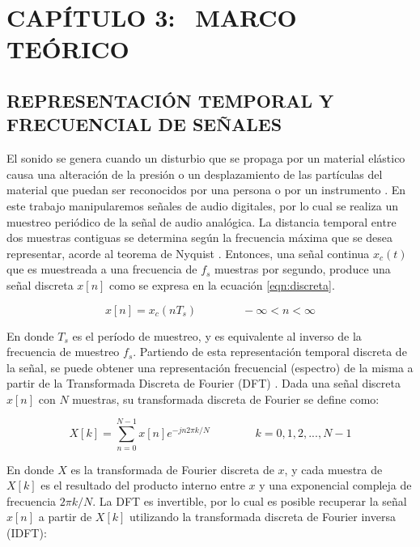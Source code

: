 \section[Marco Teórico]{CAPÍTULO 3:$\ \ \ \ $MARCO TEÓRICO} 

\subsection[Representación temporal y frecuencial de señales]{REPRESENTACIÓN TEMPORAL Y FRECUENCIAL DE SEÑALES}

El sonido se genera cuando un disturbio que se propaga por un
material elástico causa una alteración de la presión o un desplazamiento
de las partículas del material que puedan ser reconocidos por una per­sona o por un instrumento \cite{Beranek}. 
En este trabajo manipularemos señales de audio digitales, por lo cual se realiza un muestreo periódico de la señal de audio analógica. La distancia temporal entre dos muestras contiguas se determina según la frecuencia máxima que se desea representar, acorde al teorema de Nyquist \cite{openheim}. Entonces, una señal continua $x_{c}(t)$ que es muestreada a una frecuencia de $f_{s}$ muestras por segundo, produce una señal discreta $x[n]$ como se expresa en la ecuación \ref{eqn:discreta}.

\begin{equation}
\label{eqn:discreta}
	x[n] = x_{c}(nT_{s}) \qquad \qquad -\infty < n < \infty
\end{equation} 

En donde $T_{s}$ es el período de muestreo, y es equivalente al inverso de la frecuencia de muestreo $f_{s}$.
Partiendo de esta representación temporal discreta de la señal, se puede obtener una representación frecuencial (espectro) de la misma a partir de la Transformada Discreta de Fourier (DFT) \cite{openheim}. 
Dada una señal discreta $x[n]$ con $N$ muestras, su transformada discreta de Fourier se define como:

\begin{equation}
\label{eqn:DFT}
	X[k] = \sum_{n=0}^{N-1} x[n]e^{-jn2 \pi k/N} \qquad \qquad  k = 0, 1, 2,..., N-1
\end{equation} 

En donde $X$ es la transformada de Fourier discreta de $x$, y cada muestra de $X[k]$ es el resultado del producto interno entre $x$ y una exponencial compleja de frecuencia $2 \pi k/N$. La DFT es invertible, por lo cual es posible recuperar la señal $x[n]$ a partir de $X[k]$ utilizando la transformada discreta de Fourier inversa (IDFT):


